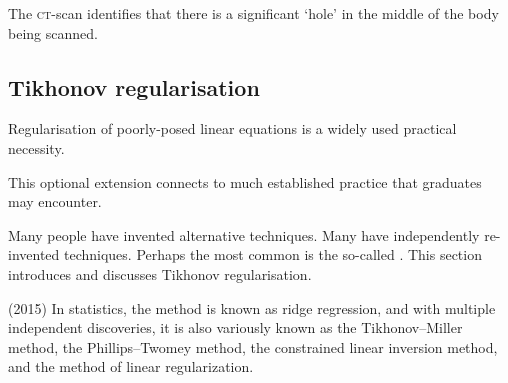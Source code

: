 \begin{example}
\begin{solution}
\begin{enumerate}
{}%
\end{enumerate}
The \textsc{ct}-scan identifies that there is a significant `hole' in the middle of the body being scanned.
\end{solution}
\end{example}














\subsection{Tikhonov regularisation}

Regularisation of poorly-posed linear equations is a widely used practical necessity.
\begin{aside} This optional extension connects to much established practice that graduates may encounter.\end{aside}
Many people have invented alternative techniques.
Many have independently re-invented techniques.
Perhaps the most common is the so-called .
This section introduces and discusses Tikhonov regularisation.

\begin{quoted}{ (2015)}
In statistics, the method is known as ridge regression, and with multiple independent discoveries, it is also variously known as the Tikhonov--Miller method, the Phillips--Twomey method, the constrained linear inversion method, and the method of linear regularization.
\end{quoted}


